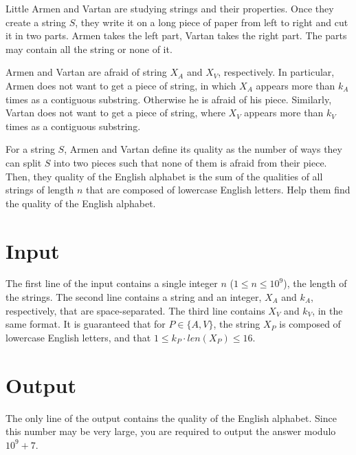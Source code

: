 
Little Armen and Vartan are studying strings and their properties.
Once they create a string $S$, they write it on a long piece of paper from left to right and cut it in two parts.
Armen takes the left part, Vartan takes the right part.
The parts may contain all the string or none of it.

Armen and Vartan are afraid of string $X_A$ and $X_V$, respectively.
In particular, Armen does not want to get a piece of string, in which $X_A$ appears more than $k_A$ times as a contiguous substring.
Otherwise he is afraid of his piece.
Similarly, Vartan does not want to get a piece of string, where $X_V$ appears more than $k_V$ times as a contiguous substring.

For a string $S$, Armen and Vartan define its quality as the number of ways they can split $S$ into two pieces such that none of them is afraid from their piece.
Then, they quality of the English alphabet is the sum of the qualities of all strings of length $n$ that are composed of lowercase English letters.
Help them find the quality of the English alphabet.

\section*{Input}
The first line of the input contains a single integer $n$ ($1 \leq n \leq 10^9$), the length of the strings.
The second line contains a string and an integer, $X_A$ and $k_A$, respectively, that are space-separated.
The third line contains $X_V$ and $k_V$, in the same format.
It is guaranteed that for $P \in \{ A, V \}$, the string $X_P$ is composed of lowercase English letters, and that $1 \leq k_P \cdot len(X_P) \leq 16$.

\section*{Output}
The only line of the output contains the quality of the English alphabet.
Since this number may be very large, you are required to output the answer modulo $10^9 + 7$.
